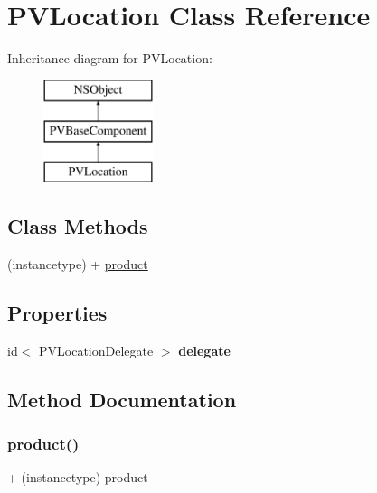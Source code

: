 \hypertarget{interface_p_v_location}{}\section{P\+V\+Location Class Reference}
\label{interface_p_v_location}
Inheritance diagram for P\+V\+Location\+:\begin{figure}[H]
\begin{center}
\leavevmode
\includegraphics[height=3.000000cm]{interface_p_v_location}
\end{center}
\end{figure}
\subsection*{Class Methods}
\begin{DoxyCompactItemize}
\item 
(instancetype) + \hyperlink{interface_p_v_location_a05ba00f7ca0035b52a293ad9ccaac1d4}{product}
\end{DoxyCompactItemize}
\subsection*{Properties}
\begin{DoxyCompactItemize}
\item 
\mbox{\label{interface_p_v_location_a634c4c77b699fbf6beea2519a933912c}} 
id$<$ P\+V\+Location\+Delegate $>$ {\bfseries delegate}
\end{DoxyCompactItemize}


\subsection{Method Documentation}
\mbox{\label{interface_p_v_location_a05ba00f7ca0035b52a293ad9ccaac1d4}} 
\subsubsection{\texorpdfstring{product()}{product()}}
{\footnotesize\ttfamily + (instancetype) product \begin{DoxyParamCaption}{ }\end{DoxyParamCaption}}


